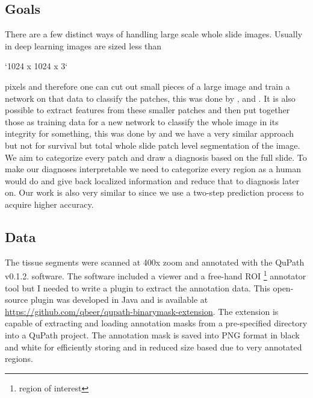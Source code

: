 \documentclass[a4paper,12pt]{article}
\begin{document}
\vspace{4mm}

\subsection{Goals}

\vspace{4mm}

\par There are a few distinct ways of handling large scale whole slide images. Usually in deep learning images are sized less than \begin{markdown}
`1024 x 1024 x 3`
\end{markdown} 
pixels and therefore one can cut out small pieces of a large image and train a network on that data to classify the patches, this was done by \cite{korbar2017deep}, \cite{bychkov2018deep} and \cite{skrede2020deep}. It is also possible to extract features from these smaller patches and then put together those as training data for a new network to classify the whole image in its integrity for something, this was done by \cite{skrede2020deep} and we have a very similar approach but not for survival but total whole slide patch level segmentation of the image. We aim to categorize every patch and draw a diagnosis based on the full slide. To make our diagnoses interpretable we need to categorize every region as a human would do and give back localized information and reduce that to diagnosis later on. Our work is also very similar to \cite{takahama2019multi} since we use a two-step prediction process to acquire higher accuracy.

\vspace{4mm}

\subsection{Data}

\vspace{4mm}

\par The tissue segments were scanned at 400x zoom and annotated with the QuPath v0.1.2. software. The software included a viewer and a free-hand ROI \footnote{region of interest} annotator tool but I needed to write a plugin to extract the annotation data. This open-source plugin was developed in Java and is available at \url{https://github.com/qbeer/qupath-binarymask-extension}. The extension is capable of extracting and loading annotation masks from a pre-specified directory into a QuPath project. The annotation mask is saved into PNG format in black and white for efficiently storing and in reduced size based due to very annotated regions.
\end{document}
